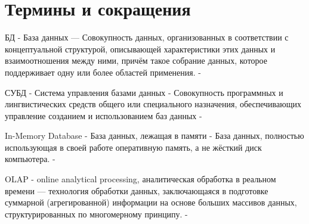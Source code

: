 \documentclass{matmex-diploma}
\begin{document}
\maketitle
\tableofcontents
\section*{Термины и сокращения}
    БД - База данных — Совокупность данных, организованных в соответствии с концептуальной структурой, описывающей характеристики этих данных и взаимоотношения между ними, причём такое собрание данных, которое поддерживает одну или более областей применения. - \cite{iso:iec:2382}
    
    СУБД - Система управления базами данных - Совокупность программных и лингвистических средств общего или специального назначения, обеспечивающих управление созданием и использованием баз данных - \cite{gost10032}
    
    In-Memory Database - База данных, лежащая в памяти - База данных, полностью использующая в своей работе оперативную память, а не жёсткий диск компьютера. - \cite{vizard}  
    
    OLAP - online analytical processing, аналитическая обработка в реальном времени — технология обработки данных, заключающаяся в подготовке суммарной (агрегированной) информации на основе больших массивов данных, структурированных по многомерному принципу. - \cite{gartner}
    
\end{document}
